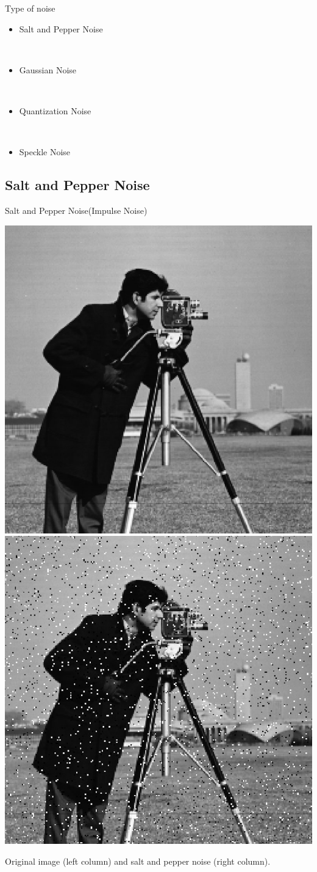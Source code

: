 \documentclass{beamer}
\begin{document}
\begin{frame}{Type of noise}


\begin{itemize}
	\item Salt and Pepper Noise
	


	
	\
	
	\item  Gaussian Noise
	
	
	\
	
	\item Quantization Noise
	
    \
    
    \item Speckle Noise


\end{itemize}

\end{frame}


\subsection{Salt and Pepper Noise}
\begin{frame}{Salt and Pepper Noise(Impulse Noise)}

\vspace{1cm}
\begin{center}

    \includegraphics[width=0.4\columnwidth]{images/salt_pepper_origin.jpg}
    \includegraphics[width=0.4\columnwidth]{images/salt_pepper_noise.jpg}
	
	Original image (left column) and salt and pepper noise (right column).



\end{center}

\end{frame}
\end{document}
